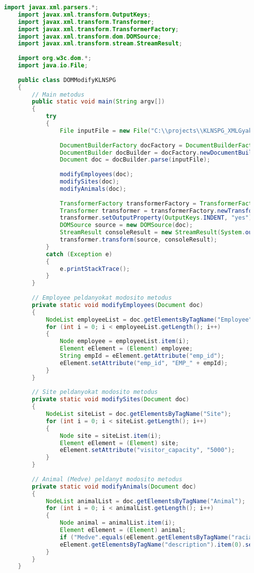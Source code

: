 \documentclass[12pt]{report}
\begin{document}
\begin{lstlisting}[caption={DOMQModifyKLNSPG.java} adatmódosító program, language=Java]
	import javax.xml.parsers.*;
	import javax.xml.transform.OutputKeys;
	import javax.xml.transform.Transformer;
	import javax.xml.transform.TransformerFactory;
	import javax.xml.transform.dom.DOMSource;
	import javax.xml.transform.stream.StreamResult;
	
	import org.w3c.dom.*;
	import java.io.File;
	
	public class DOMModifyKLNSPG 
	{
		// Main metodus
		public static void main(String argv[])
		{
			try
			{
				File inputFile = new File("C:\\projects\\KLNSPG_XMLGyak\\XMLTaskKLNSPG\\XMLKLNSPG.xml");
				
				DocumentBuilderFactory docFactory = DocumentBuilderFactory.newInstance();
				DocumentBuilder docBuilder = docFactory.newDocumentBuilder();
				Document doc = docBuilder.parse(inputFile);
				
				modifyEmployees(doc);
				modifySites(doc);
				modifyAnimals(doc);
				
				TransformerFactory transformerFactory = TransformerFactory.newInstance();
				Transformer transformer = transformerFactory.newTransformer();
				transformer.setOutputProperty(OutputKeys.INDENT, "yes");
				DOMSource source = new DOMSource(doc);
				StreamResult consoleResult = new StreamResult(System.out);
				transformer.transform(source, consoleResult);
			} 
			catch (Exception e)
			{
				e.printStackTrace();
			}
		}
		
		// Employee peldanyokat modosito metodus
		private static void modifyEmployees(Document doc)
		{
			NodeList employeeList = doc.getElementsByTagName("Employee");
			for (int i = 0; i < employeeList.getLength(); i++)
			{
				Node employee = employeeList.item(i);
				Element eElement = (Element) employee;
				String empId = eElement.getAttribute("emp_id");
				eElement.setAttribute("emp_id", "EMP_" + empId);
			}
		}
		
		// Site peldanyokat modosito metodus
		private static void modifySites(Document doc)
		{
			NodeList siteList = doc.getElementsByTagName("Site");
			for (int i = 0; i < siteList.getLength(); i++)
			{
				Node site = siteList.item(i);
				Element eElement = (Element) site;
				eElement.setAttribute("visitor_capacity", "5000");
			}
		}
		
		// Animal (Medve) peldanyt modosito metodus
		private static void modifyAnimals(Document doc)
		{
			NodeList animalList = doc.getElementsByTagName("Animal");
			for (int i = 0; i < animalList.getLength(); i++)
			{
				Node animal = animalList.item(i);
				Element eElement = (Element) animal;
				if ("Medve".equals(eElement.getElementsByTagName("racial").item(0).getTextContent()))
				eElement.getElementsByTagName("description").item(0).setTextContent("A medve eros es bator");
			}
		}
	}
\end{lstlisting}
\end{document}
